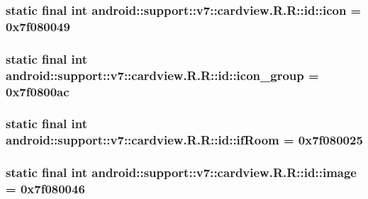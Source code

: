 \hypertarget{classandroid_1_1support_1_1v7_1_1cardview_1_1_r_1_1id_581d2476fc12073d9c4872c902f96b72}{
\subsubsection[{icon}]{\setlength{\rightskip}{0pt plus 5cm}static final int android::support::v7::cardview.R.R::id::icon = 0x7f080049}}
\label{classandroid_1_1support_1_1v7_1_1cardview_1_1_r_1_1id_581d2476fc12073d9c4872c902f96b72}


\hypertarget{classandroid_1_1support_1_1v7_1_1cardview_1_1_r_1_1id_cec90721ee10c20c96b70222bb64f96a}{
\subsubsection[{icon\_\-group}]{\setlength{\rightskip}{0pt plus 5cm}static final int android::support::v7::cardview.R.R::id::icon\_\-group = 0x7f0800ac}}
\label{classandroid_1_1support_1_1v7_1_1cardview_1_1_r_1_1id_cec90721ee10c20c96b70222bb64f96a}


\hypertarget{classandroid_1_1support_1_1v7_1_1cardview_1_1_r_1_1id_b38c104933d9baa9955a96c82bd24fcb}{
\subsubsection[{ifRoom}]{\setlength{\rightskip}{0pt plus 5cm}static final int android::support::v7::cardview.R.R::id::ifRoom = 0x7f080025}}
\label{classandroid_1_1support_1_1v7_1_1cardview_1_1_r_1_1id_b38c104933d9baa9955a96c82bd24fcb}


\hypertarget{classandroid_1_1support_1_1v7_1_1cardview_1_1_r_1_1id_608630fef0f6fed53401f7618481f9e9}{
\subsubsection[{image}]{\setlength{\rightskip}{0pt plus 5cm}static final int android::support::v7::cardview.R.R::id::image = 0x7f080046}}
\label{classandroid_1_1support_1_1v7_1_1cardview_1_1_r_1_1id_608630fef0f6fed53401f7618481f9e9}


